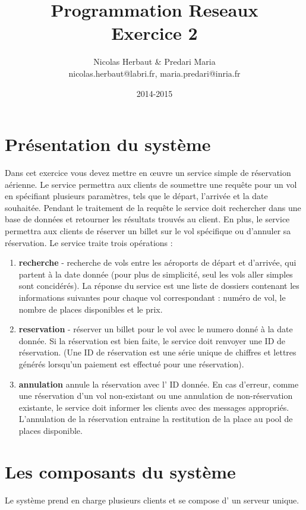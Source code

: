 \documentclass[a4paper,11pt]{article}
\title{Programmation Reseaux \\ Exercice 2}
\author{Nicolas Herbaut \& Predari Maria \\ nicolas.herbaut@labri.fr, maria.predari@inria.fr}
\date{2014-2015}
\begin{document}
\maketitle

\section*{Présentation du système}

Dans cet exercice vous devez mettre en œuvre un service simple de réservation aérienne.
 Le service permettra aux clients de soumettre une requête pour un vol en 
spécifiant plusieurs paramètres, tels que le départ, l'arrivée et la date souhaitée.
Pendant le traitement de la requête le service doit rechercher dans une base de données
 et retourner les résultats trouvés au client. En plus, le service permettra aux clients
de réserver un billet sur le vol spécifique ou d'annuler sa réservation.
 Le service traite trois opérations :
\begin{enumerate}
 \item \textbf{recherche} - recherche de vols entre les aéroports de départ et d'arrivée, qui
partent à la date donnée (pour plus de simplicité, seul les vols aller simples sont concidérés). La
réponse du service est une liste de dossiers contenant les informations suivantes pour chaque
vol correspondant : numéro de vol, le nombre de places disponibles et le prix.
\item \textbf{reservation} - réserver un billet pour le vol avec le numero donné
à la date donnée. Si la réservation est bien faite, le service doit renvoyer une
ID de réservation. (Une ID de réservation est une série unique de chiffres et lettres 
générés lorsqu'un paiement est effectué pour une réservation).

\item \textbf{annulation} annule la réservation avec l' ID donnée.
En cas d'erreur, comme une réservation d'un vol non-existant ou une
annulation de non-réservation existante, le service doit informer les clients avec des
messages appropriés. L'annulation de la réservation entraine la restitution de la place au pool de places disponible.
\end{enumerate}

\section*{Les composants du système}
Le système prend en charge plusieurs clients et se compose d' un serveur unique.
\end{document}
